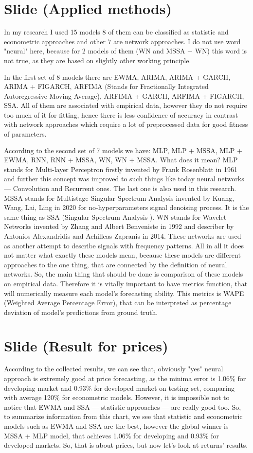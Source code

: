 \documentclass[a4paper, 12pt]{article}
\begin{document}
	\section{Slide (Applied methods)}
		In my research I used 15 models 8 of them can be classified as statistic and econometric approaches and other 7 are network approaches. I do not use word "neural" here, because for 2 models of them (WN and MSSA + WN) this word is not true, as they are based on slightly other working principle.
		
		In the first set of 8 models there are EWMA, ARIMA, ARIMA + GARCH, ARIMA + FIGARCH, ARFIMA (Stands for Fractionally Integrated Autoregressive Moving Average), ARFIMA + GARCH, ARFIMA + FIGARCH, SSA. All of them are associated with empirical data, however they do not require too much of it for fitting, hence there is less confidence of accuracy in contrast with network approaches which require a lot of preprocessed data for good fitness of parameters.
		
		According to the second set of 7 models we have: MLP, MLP + MSSA, MLP + EWMA, RNN, RNN + MSSA, WN, WN + MSSA. What does it mean? MLP stands for Multi-layer Perceptron firstly invented by Frank Rosenblatt in 1961 and further this concept was improved to such things like today neural networks --- Convolution and Recurrent ones. The last one is also used in this research. MSSA stands for Multistage Singular Spectrum Analysis invented by Kuang, Wang, Lai, Ling in 2020 for no-hyperparameters signal denoising process. It is the same thing as SSA (Singular Spectrum Analysis ). WN stands for Wavelet Networks invented by Zhang and Albert Benveniste in 1992 and describer by Antonios Alexandridis and Achilleas Zapranis in 2014. These networks are used as another attempt to describe signals with frequency patterns. All in all it does not matter what exactly these models mean, because these models are different approaches to the one thing, that are connected by the definition of neural networks. So, the main thing that should be done is comparison of these models on empirical data. Therefore it is vitally important to have metrics function, that will numerically measure each model's forecasting ability. This metrics is WAPE (Weighted Average Percentage Error), that can be interpreted as percentage deviation of model's predictions from ground truth.
	\section{Slide (Result for prices)}
		According to the collected results, we can see that, obviously "yes" neural approach is extremely good at price forecasting, as the minima error is 1.06\% for developing market and 0.93\% for developed market on testing set, comparing with average 120\% for econometric models. However, it is impossible not to notice that EWMA and SSA --- statistic approaches --- are really good too. So, to summarize information from this chart, we see that statistic and econometric models such as EWMA and SSA are the best, however the global winner is MSSA + MLP model, that achieves 1.06\% for developing and 0.93\% for developed markets. So, that is about prices, but now let's look at returns' results.
\end{document}
